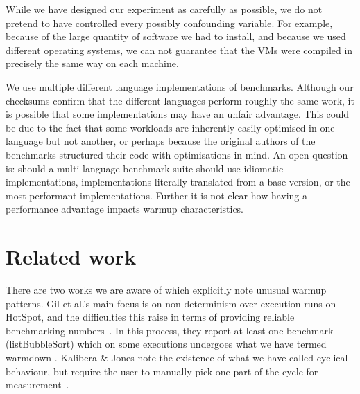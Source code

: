\documentclass[10pt,preprint]{sigplanconf}
\newcommand{\kalibera}{Kalibera \& Jones\xspace}
\begin{document}
While we have designed our experiment as carefully as possible, we do not
pretend to have controlled every possibly confounding variable. For example,
because of the large quantity of software we had to install, and because we used
different operating systems, we can not guarantee that the VMs were compiled in
precisely the same way on each machine. 

We use multiple different language implementations of benchmarks. Although our
checksums confirm that the different languages perform roughly the same work,
it is possible that some implementations may have an unfair advantage. This
could be due to the fact that some workloads are inherently easily optimised in
one language but not another, or perhaps because the original authors of the
benchmarks structured their code with optimisations in mind. An open question
is: should a multi-language benchmark suite should use idiomatic
implementations, implementations literally translated from a base version, or
the most performant implementations. Further it is not clear how having a
performance advantage impacts warmup characteristics.




\section{Related work}

There are two works we are aware of which explicitly note unusual warmup
patterns. Gil et al.'s main focus is on non-determinism over execution runs on
HotSpot, and the difficulties this raise in terms of providing reliable
benchmarking numbers~\cite{gil11microbenchmark}. In this process, they report at
least one benchmark (listBubbleSort) which on some executions undergoes what we
have termed warmdown . \kalibera note the
existence of what we have called cyclical behaviour, but require the user to
manually pick one part of the cycle for measurement~\cite{kalibera13rigorous}.
\end{document}
